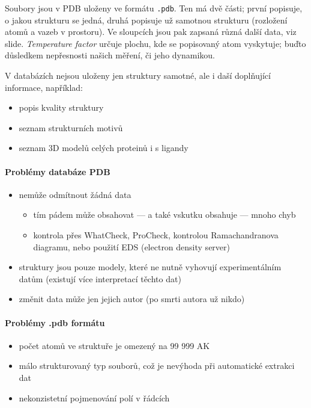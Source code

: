 \documentclass[DIV=8]{scrreprt}
\newcommand{\inlinecode}{\texttt}
\begin{document}
Soubory jsou v PDB uloženy ve formátu \inlinecode{.pdb}. Ten má dvě části; první popisuje, o jakou strukturu se jedná, druhá popisuje už samotnou strukturu (rozložení atomů a vazeb v prostoru). Ve sloupcích jsou pak zapsaná různá další data, viz slide. \emph{Temperature factor} určuje plochu, kde se popisovaný atom vyskytuje; buďto důsledkem nepřesnosti našich měření, či jeho dynamikou.

V databázích nejsou uloženy jen struktury samotné, ale i daší doplňující informace, například:
\begin{itemize}[nosep]
    \item popis kvality struktury
    \item seznam strukturních motivů
    \item seznam 3D modelů celých proteinů i s ligandy
\end{itemize}



\paragraph{Problémy databáze PDB}
\begin{itemize}[nosep]
    \item nemůže odmítnout žádná data
\begin{itemize}[nosep]
    \item tím pádem může obsahovat --- a také vskutku obsahuje --- mnoho chyb
    \item kontrola přes WhatCheck, ProCheck, kontrolou Ramachandranova diagramu, nebo použití EDS (electron density server)
\end{itemize}

    \item struktury jsou pouze modely, které ne nutně vyhovují experimentálním datům (existují více interpretací těchto dat)
    \item změnit data může jen jejich autor (po smrti autora už nikdo)
\end{itemize}



\paragraph{Problémy .pdb formátu }
\begin{itemize}[nosep]
    \item počet atomů ve struktuře je omezený na 99 999 AK
    \item málo strukturovaný typ souborů, což je nevýhoda při automatické extrakci dat
    \item nekonzistetní pojmenování polí v řádcích
\end{itemize}
\end{document}

